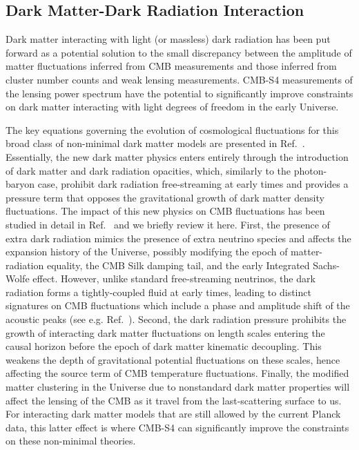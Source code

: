 \subsection{Dark Matter-Dark Radiation Interaction}
Dark matter interacting with light (or massless) dark radiation  has been put forward \cite{Buen-Abad:2015ova,Lesgourgues:2015wza} as a potential solution to the small discrepancy between the amplitude of matter fluctuations inferred from CMB measurements and those inferred from cluster number counts and weak lensing measurements. CMB-S4 measurements of the lensing power spectrum have the potential to significantly improve constraints on dark matter interacting with light degrees of freedom in the early Universe.

The key equations governing the evolution of cosmological fluctuations for this broad class of non-minimal dark matter models are presented in Ref.~\cite{Cyr-Racine:2015ihg}. Essentially, the new dark matter physics enters entirely through the introduction of dark matter and dark radiation opacities, which, similarly to the photon-baryon case, prohibit dark radiation free-streaming at early times and provides a pressure term that opposes the gravitational growth of dark matter density fluctuations. The impact of this new physics on CMB fluctuations has been studied in detail in Ref.~\cite{Cyr-Racine:2013fsa} and we briefly review it here. First, the presence of extra dark radiation mimics the presence of extra neutrino species and affects the expansion history of the Universe, possibly modifying the epoch of matter-radiation equality, the CMB Silk damping tail, and the early Integrated Sachs-Wolfe effect. However, unlike standard free-streaming neutrinos, the dark radiation forms a tightly-coupled fluid at early times, leading to distinct signatures on CMB fluctuations which include a phase and amplitude shift of the acoustic peaks (see e.g. Ref.~\cite{Bashinsky:2003tk,Cyr-Racine:2013jua,Follin:2015hya}). Second, the dark radiation pressure prohibits the growth of interacting dark matter fluctuations on length scales entering the causal horizon before the epoch of dark matter kinematic decoupling. This weakens the depth of gravitational potential fluctuations on these scales, hence affecting the source term of CMB temperature fluctuations. Finally, the modified matter clustering in the Universe due to nonstandard dark matter properties will affect the lensing of the CMB as it travel from the last-scattering surface to us. For interacting dark matter models that are still allowed by the current Planck data, this latter effect is where CMB-S4 can significantly improve the constraints on these non-minimal theories.

